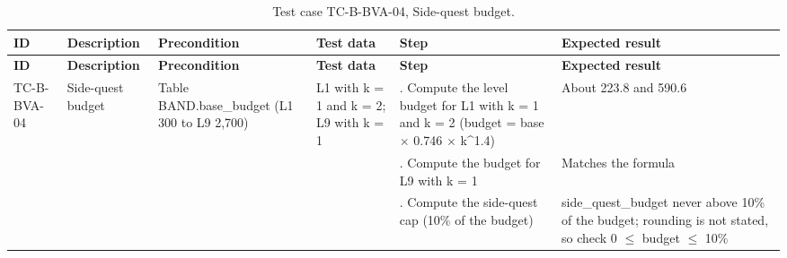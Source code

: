 {\footnotesize{}\renewcommand{\arraystretch}{1.1}
\begin{longtable}{|>{\raggedright\arraybackslash}p{}|>{\raggedright\arraybackslash}p{}|>{\raggedright\arraybackslash}p{}|>{\raggedright\arraybackslash}p{}|>{\raggedright\arraybackslash}p{}|>{\raggedright\arraybackslash}p{}|}
\caption{Test case TC-\allowbreak{}B-\allowbreak{}BVA-\allowbreak{}04, Side-quest budget.} \\
\hline
\textbf{ID} & \textbf{Description} & \textbf{Precondition} & \textbf{Test data} & \textbf{Step} & \textbf{Expected result} \\ \hline
\endfirsthead
\hline
\textbf{ID} & \textbf{Description} & \textbf{Precondition} & \textbf{Test data} & \textbf{Step} & \textbf{Expected result} \\ \hline
\endhead
TC-B-BVA-04 & Side-quest budget & Table BAND.\allowbreak{}base\_\allowbreak{}budget (L1 300 to L9 2,700) & L1 with k = 1 and k = 2; L9 with k = 1 & 1. Compute the level budget for L1 with k = 1 and k = 2 (budget = base $\times$ 0.746 $\times$ k\textasciicircum{}1.4) & About 223.8 and 590.6 \\ \cline{5-6}
 &  &  &  & 2. Compute the budget for L9 with k = 1 & Matches the formula \\ \cline{5-6}
 &  &  &  & 3. Compute the side-quest cap (10\% of the budget) & side\_\allowbreak{}quest\_\allowbreak{}budget never above 10\% of the budget; rounding is not stated, so check 0 $\leq$ budget $\leq$ 10\% \\ \hline
\end{longtable}
}

